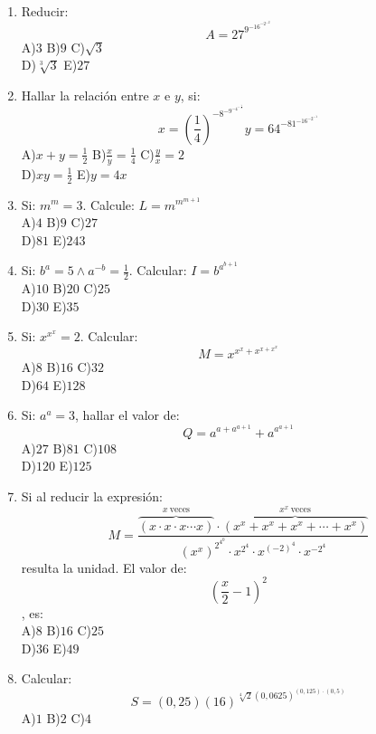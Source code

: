 \documentclass[
  10pt,
]{article}
\begin{document}
\begin{enumerate}
\[  \]A)\(1\) B)\(3\) C)\(5\)\\
  D)\(7\) E)\(9\)
\item
  Reducir:\\
  \[A = 27^{9^{- 16^{- 2^{- 2}}}}
  \]A)\(3\) B)\(9\) C)\(\sqrt{3}\)\\
  D)\(\sqrt[3]{3}\) E)\(27\)
\item
  Hallar la relación entre \(x\) e \(y\), si:\\
  \[{x = \left( \frac{1}{4} \right)^{- 8^{- 9^{- 4^{- \frac{1}{2}}}}}
  }{y = 64^{- 81^{- 16^{- 2^{- 1}}}}
  }\]A)\(x + y = \frac{1}{2}\) B)\(\frac{x}{y} = \frac{1}{4}\)
  C)\(\frac{y}{x} = 2\)\\
  D)\(xy = \frac{1}{2}\) E)\(y = 4x\)
\item
  Si: \(m^{m} = 3\). Calcule: \(L = m^{m^{m + 1}}\)\\
  A)\(4\) B)\(9\) C)\(27\)\\
  D)\(81\) E)\(243\)
\item
  Si: \(b^{a} = 5 \land a^{- b} = \frac{1}{2}\). Calcular:
  \(I = b^{a^{b + 1}}\)\\
  A)\(10\) B)\(20\) C)\(25\)\\
  D)\(30\) E)\(35\)
\item
  Si: \(x^{x^{x}} = 2\). Calcular:\\
  \[M = x^{x^{x} + x^{x + x^{x}}}
  \]A)\(8\) B)\(16\) C)\(32\)\\
  D)\(64\) E)\(128\)
\item
  Si: \(a^{a} = 3\), hallar el valor de:\\
  \[Q = a^{a + a^{a + 1}} + a^{a^{a + 1}}
  \]A)\(27\) B)\(81\) C)\(108\)\\
  D)\(120\) E)\(125\)
\item
  Si al reducir la expresión:\\
  \[M = \frac{\overset{x\ \text{veces}}{\overbrace{(x \cdot x \cdot x\cdots x)}} \cdot \overset{x^{x}\ \text{veces}}{\overbrace{\left( x^{x} + x^{x} + x^{x} + \cdots + x^{x} \right)}}}{\left( x^{x} \right)^{2^{4^{0}}} \cdot x^{2^{4}} \cdot x^{( - 2)^{4}} \cdot x^{- 2^{4}}}
  \] resulta la unidad. El valor de:\\
  \[\left( \frac{x}{2} - 1 \right)^{2}
  \], es:\\
  A)\(8\) B)\(16\) C)\(25\)\\
  D)\(36\) E)\(49\)
\item
  Calcular:\\
  \[S = (0,25)(16)^{\sqrt[4]{2}(0,0625)^{(0,125) \cdot (0,5)}}
  \]A)\(1\) B)\(2\) C)\(4\)\\

\end{enumerate}
\end{document}
